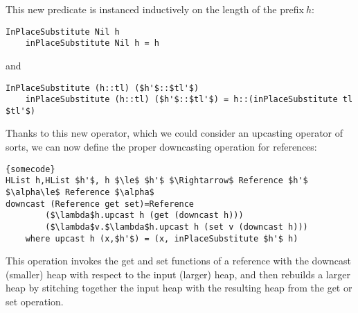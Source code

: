 \documentclass[a4paper]{article}
\begin{document}
This new predicate is instanced inductively on the length of the prefix$\ h$:

\begin{lstlisting}
InPlaceSubstitute Nil h
    inPlaceSubstitute Nil h = h
\end{lstlisting}

and

\begin{lstlisting}
InPlaceSubstitute (h::tl) ($h'$::$tl'$)
    inPlaceSubstitute (h::tl) ($h'$::$tl'$) = h::(inPlaceSubstitute tl $tl'$)
\end{lstlisting}

Thanks to this new operator, which we could consider an upcasting operator of sorts, we can now define the proper downcasting operation for references:

\begin{lstlisting}[frame=tb,mathescape]{somecode}
HList h,HList $h'$, h $\le$ $h'$ $\Rightarrow$ Reference $h'$ $\alpha\le$ Reference $\alpha$
downcast (Reference get set)=Reference
		($\lambda$h.upcast h (get (downcast h)))
		($\lambda$v.$\lambda$h.upcast h (set v (downcast h)))
	where upcast h (x,$h'$) = (x, inPlaceSubstitute $h'$ h)
\end{lstlisting}

This operation invokes the get and set functions of a reference with the downcast (smaller) heap with respect to the input (larger) heap, and then rebuilds a larger heap by stitching together the input heap with the resulting heap from the get or set operation.

\noindent 
\end{document}
